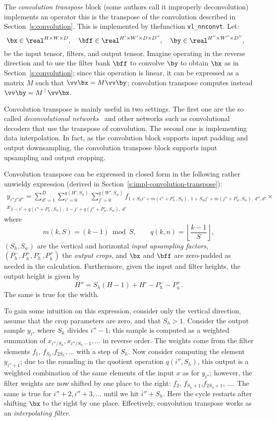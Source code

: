 The \emph{convolution transpose} block (some authors call it improperly deconvolution) implements an operator this is the transpose of the convolution described in Section~\ref{s:convolution}. This is  implemented by thefunction \verb!vl_nnconvt!. Let:
\[
 \bx\in\real^{H \times W \times D}, \quad
 \bff\in\real^{H' \times W' \times D \times D''}, \quad
 \by\in\real^{H'' \times W'' \times D''}, \quad
\]
be the input tensor, filters, and output tensor. Imagine operating in the reverse direction and to use the filter bank $\bff$ to convolve $\by$ to obtain $\bx$ as in Section~\ref{s:convolution}; since this operation is linear, it can be expressed as a matrix $M$ such that  $\vv \bx = M \vv\by$; convolution transpose computes instead $\vv \by = M^\top \vv \bx$.

Convolution transpose is mainly useful in two settings. The first one are the so called \emph{deconvolutional networks}~\cite{zeiler14visualizing} and other networks such as convolutional decoders that use the transpose of convolution. The second one is implementing data interpolation. In fact, as the convolution block supports input padding and output downsampling, the convolution transpose block supports input upsampling and output cropping. 

Convolution transpose can be expressed in closed form in the following rather unwieldy expression (derived in Section~\ref{s:impl-convolution-transpose}):
\begin{multline*}
y_{i''j''d''} = 
 \sum_{d'=1}^{D}
 \sum_{i'=0}^{q(H',S_h)}
 \sum_{j'=0}^{q(W',S_w)}
f_{
1+ S_hi' + m(i''+ P_h^-, S_h),\ %
1+ S_wj' + m(j''+ P_w^-, S_w),\ %
d'',
d'
} 
\times \\
x_{
1 - i' + q(i''+P_h^-,S_h),\ %
1 - j' + q(j''+P_w^-,S_w),\ %
d'
}
\end{multline*}
where
\[
m(k,S) = (k - 1) \bmod S,
\qquad
q(k,n) = \left\lfloor \frac{k-1}{S} \right\rfloor,
\]
$(S_h,S_w)$ are the vertical and horizontal \emph{input upsampling factors},  $(P_h^-,P_h^+,P_h^-,P_h^+)$ the \emph{output crops}, and $\bx$ and $\bff$ are zero-padded as needed in the calculation. Furthermore, given the input and filter heights, the output height is given by
\[
  H'' = S_h (H - 1) + H' -P^-_h - P^+_h.
\]
The same is true for the width.

To gain some intuition on this expression, consider only the vertical direction, assume that the crop parameters are zero, and that $S_h>1$. Consider the output sample $y_{i''}$ where $S_h$ divides $i''-1$; this sample is computed as a weighted summation of $x_{i'' / S_h},x_{i''/S_h-1},...$ in reverse order. The weights come from the filter elements $f_1$, $f_{S_h}$,$f_{2S_h},\dots$ with a step of $S_h$. Now consider computing the element $y_{i''+1}$; due to the rounding in the quotient operation $q(i'',S_h)$, this output is a weighted combination of the same elements of the input $x$ as for $y_{i''}$; however, the filter weights are now shifted by one place to the right: $f_2$, $f_{S_h+1}$,$f_{2S_h+1}$, $\dots$. The same is true for $i''+2, i'' + 3,\dots$ until we hit $i'' + S_h$. Here the cycle restarts after shifting $\bx$ to the right by one place. Effectively, convolution transpose works as an \emph{interpolating filter}.

